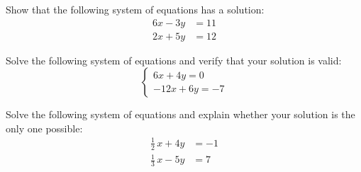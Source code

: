 \documentclass[11pt,letterpaper]{article}
\begin{document}
\newpage



 Show that the following system of equations has a solution:
	\[
	\begin{aligned}
	6x - 3y&= 11 \\[0.3cm]
	2x + 5y&= 12
	\end{aligned}
	\]



\newpage



 Solve the following system of equations and verify that your solution is valid:
	\[
	\begin{cases}
	6x + 4y= 0 \\[0.3cm]
	-12x + 6y= -7
	\end{cases}
	\]



\newpage



 Solve the following system of equations and explain whether your solution is the only one possible:
	\[
	\begin{aligned}
	\frac{1}{2}\,x + 4y&= -1 \\[0.3cm]
	\frac{1}{3}\,x - 5y&= 7
	\end{aligned}
	\]
\end{document}
